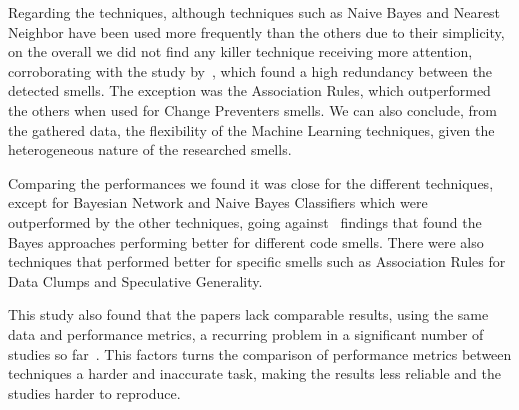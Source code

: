 Regarding the techniques, although techniques such as Naive Bayes and Nearest Neighbor have been used more frequently than the others due to their simplicity, on the overall we did not find any killer technique receiving more attention, corroborating with the study by~\cite{fernandes2016review}, which found a high redundancy between the detected smells. The exception was the Association Rules, which outperformed the others when used for Change Preventers smells. We can also conclude, from the gathered data, the flexibility of the Machine Learning techniques, given the heterogeneous nature of the researched smells.

Comparing the performances we found it was close for the different techniques, except for Bayesian Network and Naive Bayes Classifiers which were outperformed by the other techniques, going against~\cite{fontana2016comparing} findings that found the Bayes approaches performing better for different code smells. There were also techniques that performed better for specific smells such as Association Rules for Data Clumps and Speculative Generality. 

This study also found that the papers lack comparable results, using the same data and performance metrics, a recurring problem in a significant number of studies so far~\citep{rattan2013software, al2015identifying, rasool2015review, fernandes2016review}. This factors turns the comparison of performance metrics between techniques a harder and inaccurate task, making the results less reliable and the studies harder to reproduce.